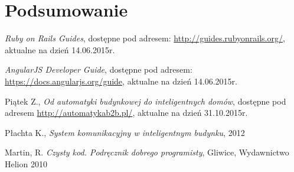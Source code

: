 \documentclass[eng,oneside]{mgr}
\begin{document}


\chapter{Podsumowanie}

\begin{thebibliography}{inteligencja}
	
	\emph{Ruby on Rails Guides}, dostępne pod adresem: \url{http://guides.rubyonrails.org/},\\ aktualne na dzień 14.06.2015r.
	
	\emph{AngularJS Developer Guide}, dostępne pod adresem: \url{https://docs.angularjs.org/guide}, aktualne na dzień 14.06.2015r.

	Piątek Z., \emph{Od automatyki budynkowej do inteligentnych domów}, dostępne pod adresem \url{http://automatykab2b.pl/}, aktualne na dzień 31.10.2015r.

	Płachta K., \emph{System komunikacyjny w inteligentnym budynku}, 2012

	Martin, R. \emph{Czysty kod. Podręcznik dobrego programisty}, Gliwice, Wydawnictwo Helion 2010
	
\end{thebibliography}
\end{document}
